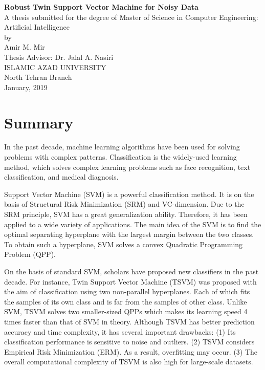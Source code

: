 \documentclass[a4paper, 12pt]{article}
\begin{document}
	
\begin{center}
	{\Large \textbf{Robust Twin Support Vector Machine for Noisy Data}} \\[0.5cm]
	
	A thesis submitted for the degree of Master of Science in Computer Engineering: Artificial Intelligence \\[0.25cm]
	
	by \\[0.25cm]
	{\large Amir M. Mir} \\ [0.5cm]
	
	Thesis Advisor: {Dr. Jalal A. Nasiri} \\[0.25cm]
	
	ISLAMIC AZAD UNIVERSITY \\
	North Tehran Branch \\[0.25cm]
	
	January, 2019
	
\end{center}

\section*{Summary}
In the past decade, machine learning algorithms have been used for solving problems with complex patterns. Classification is the widely-used learning method, which solves complex learning problems such as face recognition, text classification, and medical diagnosis.

Support Vector Machine (SVM) is a powerful classification method. It is on the basis of Structural Risk Minimization (SRM) and VC-dimension. Due to the SRM principle, SVM has a great generalization ability. Therefore, it has been applied to a wide variety of applications. The main idea of the SVM is to find the optimal separating hyperplane with the largest margin between the two classes. To obtain such a hyperplane, SVM solves a convex Quadratic Programming Problem (QPP). 

On the basis of standard SVM, scholars have proposed new classifiers in the past decade. For instance, Twin Support Vector Machine (TSVM) was proposed with the aim of classification using two non-parallel hyperplanes. Each of which fits the samples of its own class and is far from the samples of other class. Unlike SVM, TSVM solves two smaller-sized QPPs which makes its learning speed 4 times faster than that of SVM in theory. Although TSVM has better prediction accuracy and time complexity, it has several important drawbacks: (1) Its classification performance is sensitive to noise and outliers. (2) TSVM considers Empirical Risk Minimization (ERM). As a result, overfitting may occur. (3) The overall computational complexity of TSVM is also high for large-scale datasets.
\end{document}
